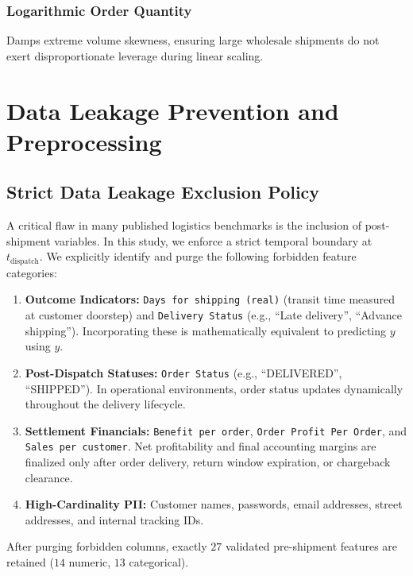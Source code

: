 \documentclass[journal,10pt,twocolumn]{IEEEtran}
\begin{document}
\subsubsection{Logarithmic Order Quantity} Damps extreme volume skewness, ensuring large wholesale shipments do not exert disproportionate leverage during linear scaling.

\section{Data Leakage Prevention and Preprocessing}
\label{sec:leakage_preprocessing}

\subsection{Strict Data Leakage Exclusion Policy}
A critical flaw in many published logistics benchmarks is the inclusion of post-shipment variables. In this study, we enforce a strict temporal boundary at $t_{\text{dispatch}}$. We explicitly identify and purge the following forbidden feature categories:
\begin{enumerate}
    \item \textbf{Outcome Indicators:} \texttt{Days for shipping (real)} (transit time measured at customer doorstep) and \texttt{Delivery Status} (e.g., ``Late delivery'', ``Advance shipping''). Incorporating these is mathematically equivalent to predicting $y$ using $y$.
    \item \textbf{Post-Dispatch Statuses:} \texttt{Order Status} (e.g., ``DELIVERED'', ``SHIPPED''). In operational environments, order status updates dynamically throughout the delivery lifecycle.
    \item \textbf{Settlement Financials:} \texttt{Benefit per order}, \texttt{Order Profit Per Order}, and \texttt{Sales per customer}. Net profitability and final accounting margins are finalized only after order delivery, return window expiration, or chargeback clearance.
    \item \textbf{High-Cardinality PII:} Customer names, passwords, email addresses, street addresses, and internal tracking IDs.
\end{enumerate}

After purging forbidden columns, exactly $27$ validated pre-shipment features are retained ($14$ numeric, $13$ categorical).
\end{document}
